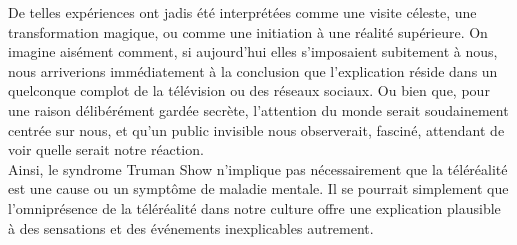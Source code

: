 \documentclass[11pt,twoside,a4paper]{article}
\begin{document}
De telles exp{\'e}riences ont jadis {\'e}t{\'e} interpr{\'e}t{\'e}es comme une visite c{\'e}leste, une transformation magique, ou comme une initiation {\`a} une r{\'e}alit{\'e} sup{\'e}rieure. On imagine ais{\'e}ment comment, si aujourd'hui elles s'imposaient subitement {\`a} nous, nous arriverions imm{\'e}diatement {\`a} la conclusion que l'explication r{\'e}side dans un quelconque complot de la t{\'e}l{\'e}vision ou des r{\'e}seaux sociaux. Ou bien que, pour une raison d{\'e}lib{\'e}r{\'e}ment gard{\'e}e secr{\`e}te, l'attention du monde serait soudainement centr{\'e}e sur nous, et qu'un public invisible nous observerait, fascin{\'e}, attendant de voir quelle serait notre r{\'e}action.~\\

Ainsi, le syndrome Truman Show n'implique pas n{\'e}cessairement que la t{\'e}l{\'e}r{\'e}alit{\'e} est une cause ou un sympt{\^o}me de maladie mentale. Il se pourrait simplement que l'omnipr{\'e}sence de la t{\'e}l{\'e}r{\'e}alit{\'e} dans notre culture offre une explication plausible {\`a} des sensations et des {\'e}v{\'e}nements inexplicables autrement.~\\
\end{document}
